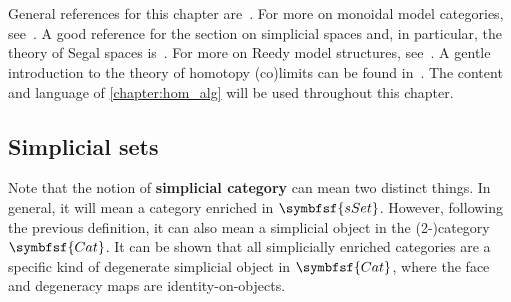 \chapter{}\label{chapter:model_theory}

    General references for this chapter are~\citet{hovey_model_2007,riehl_homotopical_2019}. For more on monoidal model categories, see~\citet{riehl_monoidal_2013}. A good reference for the section on simplicial spaces and, in particular, the theory of Segal spaces is~\citet{rezk_model_2001}. For more on Reedy model structures, see~\citet{riehl_theory_2013}. A gentle introduction to the theory of homotopy (co)limits can be found in~\citet{riehl_homotopy_2011,lambrechts_gentle_2013}. The content and language of \cref{chapter:hom_alg} will be used throughout this chapter.

    \minitoc

\section{Simplicial sets}

    \begin{remark}
        Note that the notion of \textbf{simplicial category} can mean two distinct things. In general, it will mean a category enriched in $\symbfsf{sSet}$. However, following the previous definition, it can also mean a simplicial object in the (2-)category $\symbfsf{Cat}$. It can be shown that all simplicially enriched categories are a specific kind of degenerate simplicial object in $\symbfsf{Cat}$, where the face and degeneracy maps are identity-on-objects.
    \end{remark}

